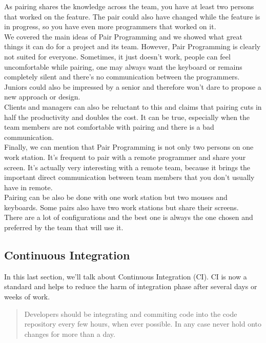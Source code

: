 As pairing shares the knowledge across the team, you have at least two
persons that worked on the feature.
The pair could also have changed while the feature is in progress, so you
have even more programmers that worked on it. \\
\newline
We covered the main ideas of Pair Programming and we showed what great
things it can do for a project and its team.
However, Pair Programming is clearly not suited for everyone.
Sometimes, it just doesn't work, people can feel uncomfortable while
pairing, one may always want the keyboard or remains completely
silent and there's no communication between the programmers.
Juniors could also be impressed by a senior and therefore won't dare to
propose a new approach or design. \\
Clients and managers can also be reluctant to this and claims that
pairing cuts in half the productivity and doubles the cost.
It can be true, especially when the team members are not comfortable with
pairing and there is a bad communication. \\
\newline
Finally, we can mention that Pair Programming is not only two persons on
one work station.
It's frequent to pair with a remote programmer and share your screen.
It's actually very interesting with a remote team, because it brings the
important direct communication between team members that you don't
usually have in remote. \\
Pairing can be also be done with one work station but two mouses and
keyboards.
Some pairs also have two work stations but share their screens. \\
There are a lot of configurations and the best one is always the one
chosen and preferred by the team that will use it.

\subsection{Continuous Integration}\label{subsec:continuous-integration}
In this last section, we'll talk about Continuous Integration (CI).
CI is now a standard and helps to reduce the harm of integration phase
after several days or weeks of work.
\begin{quotation}
    Developers should be integrating and commiting code into the code
    repository every few hours, when ever possible.
    In any case never hold onto changes for more than a day.
\end{quotation}

